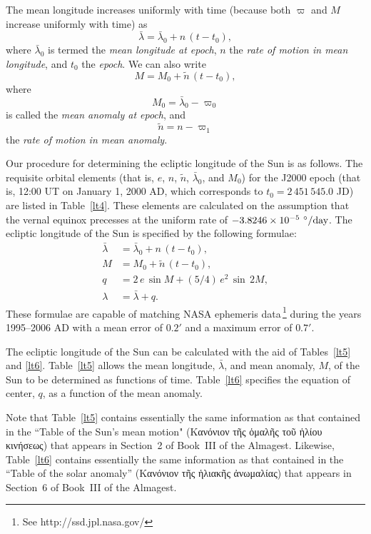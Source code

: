 The mean longitude increases
uniformly with time (because both $\varpi$ and $M$ increase uniformly with time) as
\begin{equation}\label{ae84}
\bar{\lambda} =  \bar{\lambda}_0+ n\,(t -t_0),
\end{equation}
where $\bar{\lambda}_0$ is termed the
{\em mean longitude at epoch}, 
$n$ the {\em rate of motion in mean longitude}, and $t_0$ the {\em epoch}. 
We can also write
\begin{equation}\label{ae85}
M = M_0 + \tilde{n}\,(t-t_0),
\end{equation}
where
\begin{equation}
M_0 = \bar{\lambda}_0 - \varpi_0
\end{equation}
is called the {\em mean anomaly at epoch}, and 
\begin{equation}\label{ae87}
\tilde{n} = n - \varpi_1
\end{equation}
 the {\em rate of motion in mean anomaly}. 
 
 Our procedure for determining the ecliptic longitude of the Sun is as follows.
 The requisite orbital elements (that is, $e$, $n$, $\tilde{n}$, $\bar{\lambda}_0$, and $M_0$) for the J2000 epoch (that is, 12:00 UT on January 1, 2000 AD, which corresponds to $t_0= 2\,451\,545.0$ JD) are listed
in Table~\ref{lt4}. These elements are calculated
on the assumption that the vernal equinox  precesses at the uniform
rate of $-3.8246\times 10^{-5}\,\,^\circ/{\rm day}$. 
The ecliptic longitude of the Sun is specified by the
following formulae:
\begin{align}
\bar{\lambda} &=  \bar{\lambda}_0+ n\,(t-t_0),\\[0.5ex]
M &= M_0 + \tilde{n}\,(t-t_0),\\[0.5ex]
q &= 2\,e\,\sin M + (5/4)\,e^2\,\sin\,2M,\label{le2.8}\\[0.5ex]
\lambda &= \bar{\lambda}  + q.
\end{align}
 These formulae are capable of matching NASA ephemeris data\,\footnote{See {http://ssd.jpl.nasa.gov/}}
during the years 1995--2006 AD with a mean error of $0.2'$ and a maximum error of $0.7'$. 

The ecliptic longitude of the Sun can be calculated with the aid of Tables~\ref{lt5} and \ref{lt6}.
 Table~\ref{lt5} allows the mean longitude, $\bar{\lambda}$, and mean anomaly,
 $M$, of the
Sun to be determined as  functions of time. Table~\ref{lt6} specifies the equation of center, $q$, as a
function of the mean anomaly. 

 Note that Table~\ref{lt5} contains essentially the same information as that contained in the ``Table of the Sun's mean motion" (Κανόνιον τῆς ὁμαλῆς τοῦ ἡλίου κινήσεως) that appears in
 Section~2 of Book~III of the Almagest. Likewise, Table~\ref{lt6} contains essentially the same information as that contained in the ``Table of the solar anomaly'' (Κανόνιον τῆς  ἡλιακῆς ἀνωμαλίας)
 that appears in Section~6 of Book~III of the Almagest.
 

